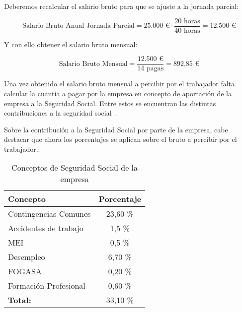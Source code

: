 Deberemos recalcular el salario bruto para que se ajuste a la jornada parcial:

\[
\text{Salario Bruto Anual Jornada Parcial} = \text{25.000 €}  \cdot \frac{\text{20 horas}}{\text{40 horas}} = \text{12.500 €}
\]

Y con ello obtener el salario bruto mensual:

\[
\text{Salario Bruto Mensual} = \frac{\text{12.500 €}}{\text{14 pagas}} = \text{892,85 €}
\]

Una vez obtenido el salario bruto mensual a percibir por el trabajador falta calcular la cuantía a pagar por la empresa en concepto de aportación de la empresa a la Seguridad Social. Entre estos se encuentran las distintas contribuciones a la seguridad social~\cite{segsocialSeguridadSocial}.


%
%

Sobre la contribución a la Seguridad Social por parte de la empresa, cabe destacar que ahora los porcentajes se aplican sobre el bruto a percibir por el trabajador.:

\begin{table}[h!]
	\centering
	\begin{tabular}{| l | c |}
		\toprule
		\textbf{Concepto} & \textbf{Porcentaje} \\ \midrule
		Contingencias Comunes & 23,60 \%\\
		Accidentes de trabajo & 1,5 \%\\
		MEI & 0,5 \%\\
		Desempleo & 6,70 \% \\
		FOGASA & 0,20 \%\\
		Formación Profesional & 0,60 \% \\
		\midrule
		\textbf{Total:} & 33,10 \% \\
		\bottomrule
	\end{tabular}
	\caption{Conceptos de Seguridad Social de la empresa}
	\label{SSempresa}
\end{table}


